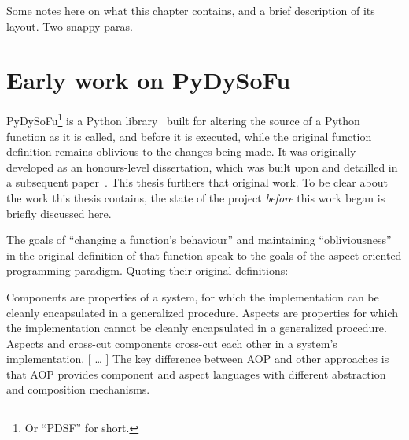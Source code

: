 







Some notes here on what this chapter contains, and a brief description of its
layout. Two snappy paras.



\section{Early work on PyDySoFu}

PyDySoFu\footnote{Or ``PDSF'' for short.} is a Python library~\cite{pdsf_repo}
built for altering the source of a Python function as it is called, and before
it is executed, while the original function definition remains oblivious to the
changes being made. It was originally developed as an honours-level
dissertation, which was built upon and detailled in a subsequent
paper~\cite{wallis2018caise}. This thesis furthers that original work. To be
clear about the work this thesis contains, the state of the project
\emph{before} this work began is briefly discussed here.

The goals of ``changing a function's behaviour'' and maintaining
``obliviousness'' in the original definition of that function speak to the goals
of the aspect oriented programming paradigm\cite{kiczales1997aspect}. Quoting
their original definitions:

\begin{displayquote}
    Components are properties of a system, for which the implementation can be
    cleanly encapsulated in a generalized procedure. Aspects are properties
    for which the implementation cannot be cleanly encapsulated in a
    generalized procedure. Aspects and cross-cut components cross-cut each other
    in a system’s implementation.
    [ \ldots{} ]
    The key difference between
    AOP and other approaches is that AOP provides component and aspect languages
    with different abstraction and composition mechanisms.
\end{displayquote}

